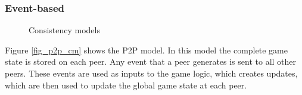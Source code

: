 \documentclass[journal,oneside,a4paper,onecolumn]{IEEEtran}
\begin{document}
\subsubsection{Event-based}

\begin{figure}[htbp]
\centering
{}
\caption{Consistency models}
\end{figure}
%
Figure \ref{fig_p2p_cm} shows the P2P model. In this model the complete game state is stored on each peer. Any event that a peer generates is sent to all other peers. These events are used as inputs to the game logic, which creates updates, which are then used to update the global game state at each peer.
\end{document}
